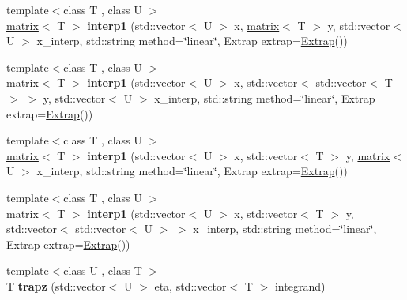 \begin{DoxyCompactItemize}
\item 
\hypertarget{namespacekeycpp_ad6dfc562f4ab516d21be63ab8a9c1b23}{{\footnotesize template$<$class T , class U $>$ }\\\hyperlink{classkeycpp_1_1matrix}{matrix}$<$ T $>$ {\bfseries interp1} (std\-::vector$<$ U $>$ x, \hyperlink{classkeycpp_1_1matrix}{matrix}$<$ T $>$ y, std\-::vector$<$ U $>$ x\-\_\-interp, std\-::string method=\char`\"{}linear\char`\"{}, Extrap extrap=\hyperlink{classkeycpp_1_1_extrap}{Extrap}())}\label{namespacekeycpp_ad6dfc562f4ab516d21be63ab8a9c1b23}

\item 
\hypertarget{namespacekeycpp_a3b44770c6a8c5ba4acb6fe6ead6cc811}{{\footnotesize template$<$class T , class U $>$ }\\\hyperlink{classkeycpp_1_1matrix}{matrix}$<$ T $>$ {\bfseries interp1} (std\-::vector$<$ U $>$ x, std\-::vector$<$ std\-::vector$<$ T $>$ $>$ y, std\-::vector$<$ U $>$ x\-\_\-interp, std\-::string method=\char`\"{}linear\char`\"{}, Extrap extrap=\hyperlink{classkeycpp_1_1_extrap}{Extrap}())}\label{namespacekeycpp_a3b44770c6a8c5ba4acb6fe6ead6cc811}

\item 
\hypertarget{namespacekeycpp_ac5ab894467bbea180c9b283895d5d5d3}{{\footnotesize template$<$class T , class U $>$ }\\\hyperlink{classkeycpp_1_1matrix}{matrix}$<$ T $>$ {\bfseries interp1} (std\-::vector$<$ U $>$ x, std\-::vector$<$ T $>$ y, \hyperlink{classkeycpp_1_1matrix}{matrix}$<$ U $>$ x\-\_\-interp, std\-::string method=\char`\"{}linear\char`\"{}, Extrap extrap=\hyperlink{classkeycpp_1_1_extrap}{Extrap}())}\label{namespacekeycpp_ac5ab894467bbea180c9b283895d5d5d3}

\item 
\hypertarget{namespacekeycpp_a4c19f6ff8e0001eca5c63529bd58e664}{{\footnotesize template$<$class T , class U $>$ }\\\hyperlink{classkeycpp_1_1matrix}{matrix}$<$ T $>$ {\bfseries interp1} (std\-::vector$<$ U $>$ x, std\-::vector$<$ T $>$ y, std\-::vector$<$ std\-::vector$<$ U $>$ $>$ x\-\_\-interp, std\-::string method=\char`\"{}linear\char`\"{}, Extrap extrap=\hyperlink{classkeycpp_1_1_extrap}{Extrap}())}\label{namespacekeycpp_a4c19f6ff8e0001eca5c63529bd58e664}

\item 
\hypertarget{namespacekeycpp_ad817c482d12509f0938849890bb4de4e}{{\footnotesize template$<$class U , class T $>$ }\\T {\bfseries trapz} (std\-::vector$<$ U $>$ eta, std\-::vector$<$ T $>$ integrand)}\label{namespacekeycpp_ad817c482d12509f0938849890bb4de4e}


\end{DoxyCompactItemize}
